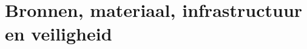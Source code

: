 
\section{Bronnen, materiaal, infrastructuur en veiligheid}
\helpbronnen

\helpdidactmat

\helpinfrastructuur

\helpveiligheid